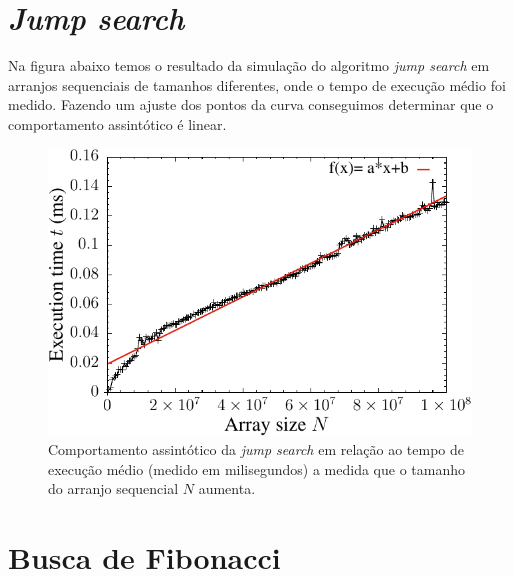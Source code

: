 \section{{\it Jump search}}

Na figura abaixo temos o resultado da simulação do algoritmo {\it jump search} em arranjos sequenciais de tamanhos diferentes, onde o tempo de execução médio foi medido. Fazendo um ajuste dos pontos da curva conseguimos determinar que o comportamento assintótico é linear.
\begin{figure}[H]
  \centering
  \includegraphics[scale=1.2]{../plots/jumpsearch_time.pdf}
  \caption{Comportamento assintótico da {\it jump search} em relação ao tempo de execução médio (medido em milisegundos) a medida que o tamanho do arranjo sequencial $N$ aumenta.}
  \label{fig:jumpsearch_time}
\end{figure} 

\section{Busca de Fibonacci}

